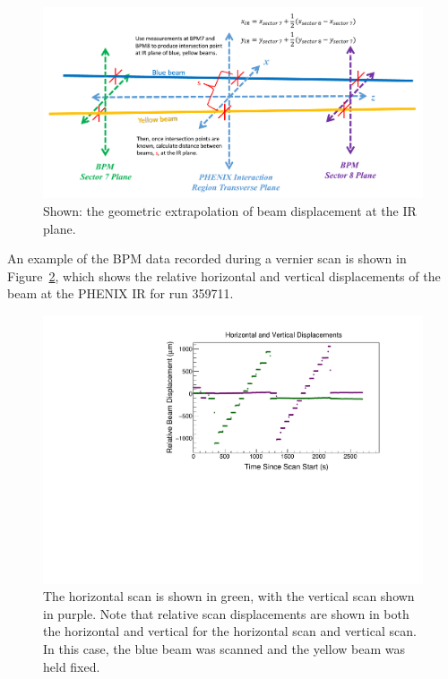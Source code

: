 \begin{figure}[ht]
\begin{center}
\includegraphics[width=1.0\linewidth]{./figures/bpm_ir_beam_separation}
\caption{
  Shown: the geometric extrapolation of beam displacement at the IR plane.
}
\label{fig:bpm_ir_xing_cartoon}
\end{center}
\end{figure}


An example of the BPM data recorded during a vernier scan is shown in
Figure~\ref{fig:bpm_data_run359711}, which shows the relative horizontal
and vertical displacements of the beam at the PHENIX IR for run 359711.

\begin{figure}[ht]
  \centering
  \includegraphics[width=0.8\linewidth]{./figures/bpm_data_scan_359711.pdf}
  \caption{
    The horizontal scan is shown in green, with the vertical scan shown in
    purple. Note that relative scan displacements are shown in both the
    horizontal and vertical for the horizontal scan and vertical scan. In this
    case, the blue beam was scanned and the yellow beam was held fixed.
  }
  \label{fig:bpm_data_run359711}
\end{figure}

